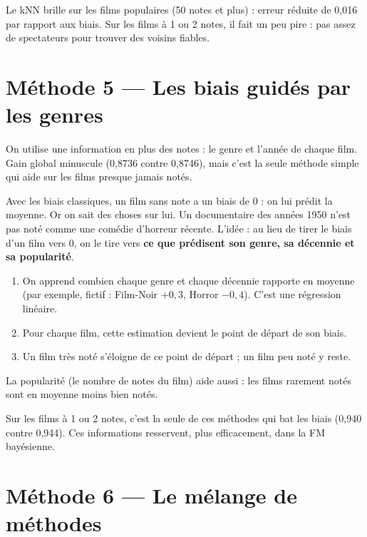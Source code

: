 \documentclass[11pt,a4paper]{article}
\begin{document}
Le kNN brille sur les films populaires (50 notes et plus) : erreur réduite de 0,016 par
rapport aux biais. Sur les films à 1 ou 2 notes, il fait un peu pire : pas assez de
spectateurs pour trouver des voisins fiables.

\section{Méthode 5 --- Les biais guidés par les genres}\label{sec:genres}

\begin{enbref}
On utilise une information en plus des notes : le genre et l'année de chaque film.
Gain global minuscule (0,8736 contre 0,8746), mais c'est la seule méthode \og simple \fg
qui aide sur les films presque jamais notés.
\end{enbref}

Avec les biais classiques, un film sans note a un biais de 0 : on lui prédit la moyenne.
Or on sait des choses sur lui. Un documentaire des années 1950 n'est pas noté comme une
comédie d'horreur récente. L'idée : au lieu de tirer le biais d'un film vers 0, on le
tire vers \textbf{ce que prédisent son genre, sa décennie et sa popularité}.
\begin{enumerate}
  \item On apprend combien chaque genre et chaque décennie rapporte en moyenne (par
        exemple, fictif : \og Film-Noir \fg $+0{,}3$, \og Horror \fg $-0{,}4$).
        C'est une régression linéaire.
  \item Pour chaque film, cette estimation devient le point de départ de son biais.
  \item Un film très noté s'éloigne de ce point de départ ; un film peu noté y reste.
\end{enumerate}
La popularité (le nombre de notes du film) aide aussi : les films rarement notés sont en
moyenne moins bien notés.

Sur les films à 1 ou 2 notes, c'est la seule de ces méthodes qui bat les biais (0,940
contre 0,944). Ces informations resservent, plus efficacement, dans la FM bayésienne.

\section{Méthode 6 --- Le mélange de méthodes}\label{sec:melange}
\end{document}
